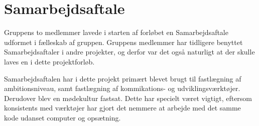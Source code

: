 \chapter{Samarbejdsaftale}

Gruppens to medlemmer lavede i starten af forløbet en Samarbejdsaftale udformet i fælleskab af gruppen. Gruppens medlemmer har tidligere benyttet Samarbejdsaftaler i andre projekter, og derfor var det også naturligt at der skulle laves en i dette projektforløb.

Samarbejdsaftalen har i dette projekt primært blevet brugt til fastlægning af ambitionsniveau, samt fastlægning af kommikations- og udviklingsværktøjer. Derudover blev en mødekultur fastsat. Dette har specielt været vigtigt, eftersom konsistents med værktøjer har gjort det nemmere at arbejde med det samme kode udanset computer og opsætning.